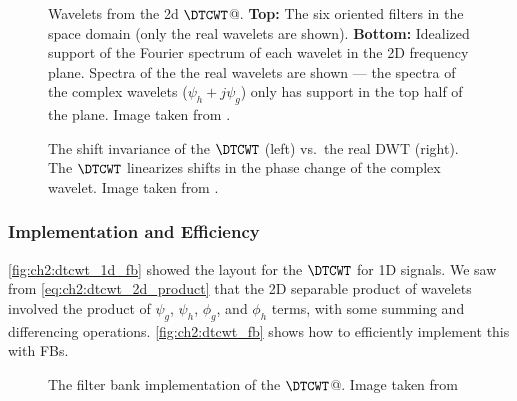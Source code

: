   \begin{figure}
    \centering
      \caption[Wavelets from the 2D $\DTCWT$]
              {Wavelets from the 2d $\DTCWT$@. \textbf{Top:} The six  oriented filters
      in the space domain (only the real wavelets are shown). \textbf{Bottom:}
      Idealized support of the Fourier spectrum of each wavelet in the 2D
      frequency plane. Spectra of the the real wavelets are shown --- the
      spectra of the complex wavelets ($\psi_h + j\psi_g$) only has support in the top
      half of the plane. Image taken from \citep{selesnick_dual-tree_2005}.}
      \label{fig:ch2:dtcwt_wavelets}
  \end{figure}
  \begin{figure}
    \centering
      \makebox[\textwidth][c]{%
      }
      \caption[The shift invariance ofthe $\DTCWT$ vs.\ the real DWT]
              {The shift invariance of the $\DTCWT$ (left) vs.\ the real DWT
              (right). The $\DTCWT$ linearizes shifts in the phase change of the complex
              wavelet. Image taken from \citep{kingsbury_dual-tree_1998}.}
      \label{fig:ch2:dtcwt_shift_invariance}
  \end{figure}

\subsubsection{Implementation and Efficiency}\label{sec:ch2:dtcwt_efficiency}
  \autoref{fig:ch2:dtcwt_1d_fb} showed the layout for the $\DTCWT$ for 1D signals. We
  saw from \eqref{eq:ch2:dtcwt_2d_product} that the 2D separable product of wavelets
  involved the product of $\psi_g$, $\psi_h$, $\phi_g$, and $\phi_h$ terms, with
  some summing and differencing operations. \autoref{fig:ch2:dtcwt_fb} shows how to
  efficiently implement this with FBs.
  
  \begin{figure}
    \centering
    \makebox[\textwidth][c]{%
    }
      \caption[The filter bank implementation of the $\DTCWT$]
              {The filter bank implementation of the $\DTCWT$@. Image taken from 
              \citep{kingsbury_image_1999}}
      \label{fig:ch2:dtcwt_fb}
  \end{figure}

